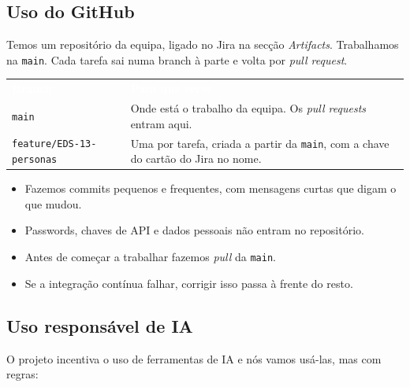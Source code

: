 \documentclass[11pt,a4paper]{article}
\newcommand{\th}[1]{\textcolor{white}{\sffamily\bfseries #1}}
\begin{document}
\subsection{Uso do GitHub}

Temos um repositório da equipa, ligado no Jira na secção \textit{Artifacts}. Trabalhamos na \texttt{main}. Cada tarefa sai numa branch à parte e volta por \textit{pull request}.

\small
\renewcommand{\arraystretch}{1.5}
\begin{tabularx}{\textwidth}{N{4.9cm} Y}
   \th{Branch} & \th{Para que serve} \\
   \texttt{main} & Onde está o trabalho da equipa. Os \textit{pull requests} entram aqui. \\
   \texttt{feature/EDS-13-personas} & Uma por tarefa, criada a partir da \texttt{main}, com a chave do cartão do Jira no nome. \\
  \bottomrule
\end{tabularx}
\renewcommand{\arraystretch}{1}
\normalsize

\begin{itemize}
  \item Fazemos commits pequenos e frequentes, com mensagens curtas que digam o que mudou.
  \item Passwords, chaves de API e dados pessoais não entram no repositório.
  \item Antes de começar a trabalhar fazemos \textit{pull} da \texttt{main}.
  \item Se a integração contínua falhar, corrigir isso passa à frente do resto.
\end{itemize}

\subsection{Uso responsável de IA}

O projeto incentiva o uso de ferramentas de IA e nós vamos usá-las, mas com regras:
\end{document}
